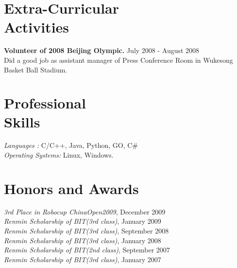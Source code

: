\documentclass[margin]{res}
\begin{document}
\begin{resume}
\section{Extra-Curricular \\ Activities} 
				{ \bf Volunteer of 2008 Beijing Olympic.} \hfill July 2008 - August 2008 \\  		
                 Did a good job as assistant manager of Press Conference Room in Wukesong Basket Ball Stadium.
 
 \section{Professional \\ Skills} {\sl Languages :} C/C++, Java, Python, GO, C\# \\
                {\sl Operating Systems:} Linux, Windows.
 
\section{Honors and Awards }             
             {\it 3rd Place in Robocup ChinaOpen2009}, 	December	2009 \\             			
			 {\it Renmin Scholarship of BIT(3rd class)}, January	2009 \\            	
			 {\it Renmin Scholarship of BIT(3rd class)}, September	2008 \\            
			 {\it Renmin Scholarship of BIT(3rd class)}, January	2008 \\            
			 {\it Renmin Scholarship of BIT(2nd class)}, September	2007 \\  
			 {\it Renmin Scholarship of BIT(3rd class)}, January	2007 			 			 
\end{resume}
\end{document}
